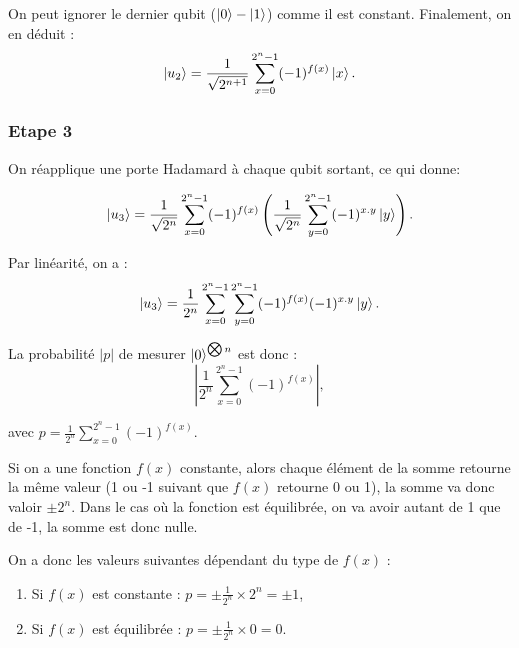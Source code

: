 On peut ignorer le dernier qubit ($\ket{0} - \ket{1}$) comme il est
constant. Finalement, on en déduit :
\begin{equation}
\ket{u_2} = \frac{1}{\sqrt{2^{n + 1}}}
\displaystyle\sum_{x=0}^{2^n-1} (-1)^{f(x)}\ket{x}.
\end{equation}

\subsubsection{Etape 3}


On réapplique une porte Hadamard à chaque qubit sortant, ce qui donne:

\[ 
  \ket{u_3} = \frac{1}{\sqrt{2^{n}}}
\displaystyle\sum_{x=0}^{2^n-1} (-1)^{f(x)} \left( \frac{1}{\sqrt{2^{n}}} \displaystyle\sum_{y=0}^{2^n-1} (-1)^{x.y}\ket{y} \right) .
\]

Par linéarité, on a :
\begin{equation}
  \label{eq:1}
  \ket{u_3} = \frac{1}{2^{n}}
  \displaystyle\sum_{x=0}^{2^n-1} \displaystyle\sum_{y=0}^{2^n-1}(-1)^{f(x)} (-1)^{x.y}\ket{y}  .
\end{equation}

La probabilité $|p|$ de mesurer $\ket{0}^{\bigotimes n}$ est donc : 
\begin{equation}
  \label{eq:2}
  |\frac{1}{2^{n}}\displaystyle\sum_{x=0}^{2^n-1}(-1)^{f(x)}|,
\end{equation}

avec $p = \frac{1}{2^{n}}\displaystyle\sum_{x=0}^{2^n-1}(-1)^{f(x)}$.

Si on a une fonction $f(x)$ constante, alors chaque élément de la
somme retourne la même valeur (1 ou -1 suivant que $f(x)$ retourne 0
ou 1), la somme va donc valoir $\pm 2^{n}$. Dans le cas où la fonction
est équilibrée, on va avoir autant de 1 que de -1, la somme est donc
nulle.

On a donc les valeurs suivantes dépendant du type de $f(x)$ :
\begin{enumerate}
  \item Si $f(x)$ est constante :  $p = \pm \frac{1}{2^n} \times 2^{n} = \pm 1$,
  \item Si $f(x)$ est équilibrée : $p = \pm \frac{1}{2^n} \times 0 = 0$.
\end{enumerate}


